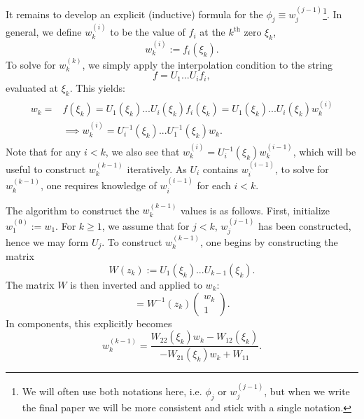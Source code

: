 It remains to develop an explicit (inductive) formula for the $\phi_j\equiv w_j^{(j-1)}$\footnote{We will often use both notations here, i.e. $\phi_j$ or $w_j^{(j-1)}$, but when we write the final paper we will be more consistent and stick with a single notation.}. In general, we define $w_k^{(i)}$ to be the value of $f_i$ at the $k^\mathrm{th}$ zero $\xi_k$,
\begin{equation}
    w_k^{(i)} := f_i(\xi_k).
\end{equation}
To solve for $w_k^{(k)}$, we simply apply the interpolation condition to the string
\begin{equation}
    f = U_1 ... U_i f_i,
\end{equation}
evaluated at $\xi_k$. This yields:
\begin{align}\begin{split}
    w_k =& f(\xi_k) = U_1(\xi_k) ... U_i(\xi_k) f_i(\xi_k) = U_1(\xi_k) ... U_i(\xi_k) w_k^{(i)} \\
    &\implies w_k^{(i)} = U_i^{-1}(\xi_k) ... U_1^{-1}(\xi_k) w_k.
\end{split}\end{align}
Note that for any $i < k$, we also see that $w_k^{(i)} = U_i^{-1}(\xi_k) w_k^{(i-1)}$, which will be useful to construct $w_k^{(k-1)}$ iteratively. As $U_i$ contains $w_i^{(i-1)}$, to solve for $w_k^{(k-1)}$, one requires knowledge of $w_i^{(i-1)}$ for each $i < k$. 

The algorithm to construct the $w_k^{(k-1)}$ values is as follows. First, initialize $w_{1}^{(0)} := w_1$. For $k\geq 1$, we assume that for $j < k$, $w_j^{(j-1)}$ has been constructed, hence we may form $U_j$. To construct $w_{k}^{(k-1)}$, one begins by constructing the matrix
\begin{equation}
    W(z_k) := U_1(\xi_k) ... U_{k-1}(\xi_k).
\end{equation}
The matrix $W$ is then inverted and applied to $w_k$:
\begin{equation}
    [w_k^{(k-1)}] = W^{-1}(z_k) \begin{pmatrix}
        w_k \\ 1
    \end{pmatrix}.
\end{equation}
In components, this explicitly becomes
\begin{equation}
    w_k^{(k-1)} = \frac{W_{22}(\xi_k) w_k - W_{12}(\xi_k)}{-W_{21}(\xi_k) w_k + W_{11}}.
\end{equation}

